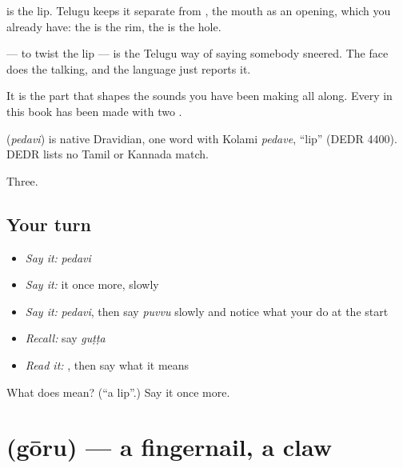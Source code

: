  is the lip. Telugu keeps it separate from , the mouth as an opening, which you already have: the  is the rim, the  is the hole.

  — to twist the lip — is the Telugu way of saying somebody sneered. The face does the talking, and the language just reports it.

It is the part that shapes the sounds you have been making all along. Every  in this book has been made with two .

\begin{cousinweb}
\textbf{} (\emph{pedavi}) is native Dravidian, one word with Kolami \emph{pedave}, \textquotedblleft{}lip\textquotedblright{} (DEDR 4400). DEDR lists no Tamil or Kannada match.
\end{cousinweb}

\begin{grammarlens}[title={What you've built}]
Three.
\end{grammarlens}

\subsection*{Your turn}
\begin{itemize}
\raggedright
  \item \emph{Say it:} \emph{pedavi}
  \item \emph{Say it:} it once more, slowly
  \item \emph{Say it:} \emph{pedavi}, then say \emph{puvvu} slowly and notice what your  do at the start
  \item \emph{Recall:} say \emph{guṭṭa}
  \item \emph{Read it:} \textbf{}, then say what it means
\end{itemize}

\begin{tcolorbox}[breakable,colback=teal!4,colframe=teal!35!black,title={Before you move on}]
What does  mean? (\textquotedblleft{}a lip\textquotedblright{}.) Say it once more.
\end{tcolorbox}
\section[\texorpdfstring{\te{గోరు} (gōru)}{గోరు (gōru)}]{ (gōru) — a fingernail, a claw}

\label{lesson:TE-C57-nail}



